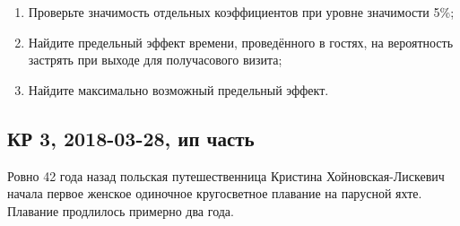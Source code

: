 \begin{enumerate}
\begin{enumerate}
\item Проверьте значимость отдельных коэффициентов при уровне значимости 5\%;
\item Найдите предельный эффект времени, проведённого в гостях, на вероятность застрять при выходе для получасового визита;  
\item Найдите максимально возможный предельный эффект.
\end{enumerate}


\end{enumerate}

\subsection{КР 3, 2018-03-28, ип часть}


Ровно 42 года назад польская путешественница Кристина Хойновская-Лискевич начала первое женское одиночное кругосветное плавание на парусной яхте.
Плавание продлилось примерно два года.



